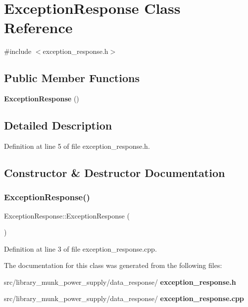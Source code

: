 \section{Exception\+Response Class Reference}
\label{class_exception_response}


{\ttfamily \#include $<$exception\+\_\+response.\+h$>$}

\subsection*{Public Member Functions}
\begin{DoxyCompactItemize}
\item 
\textbf{ Exception\+Response} ()
\end{DoxyCompactItemize}


\subsection{Detailed Description}


Definition at line 5 of file exception\+\_\+response.\+h.



\subsection{Constructor \& Destructor Documentation}
\mbox{\label{class_exception_response_af487015ab89a8e3a4cdc3d5fcf220186}} 
\subsubsection{Exception\+Response()}
{\footnotesize\ttfamily Exception\+Response\+::\+Exception\+Response (\begin{DoxyParamCaption}{ }\end{DoxyParamCaption})}



Definition at line 3 of file exception\+\_\+response.\+cpp.



The documentation for this class was generated from the following files\+:\begin{DoxyCompactItemize}
\item 
src/library\+\_\+munk\+\_\+power\+\_\+supply/data\+\_\+response/\textbf{ exception\+\_\+response.\+h}\item 
src/library\+\_\+munk\+\_\+power\+\_\+supply/data\+\_\+response/\textbf{ exception\+\_\+response.\+cpp}\end{DoxyCompactItemize}
